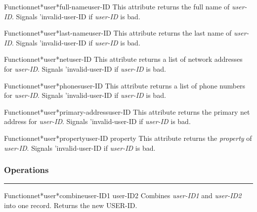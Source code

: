 \begin{functiondoc}{Function}{net*user*full-name}{user-ID}
This attribute returns the full name of {\em user-ID}.
Signals 'invalid-user-ID if {\em user-ID} is bad.
\end{functiondoc}

\begin{functiondoc}{Function}{net*user*last-name}{user-ID}
This attribute returns the last name of {\em user-ID}.
Signals 'invalid-user-ID if {\em user-ID} is bad.
\end{functiondoc}

\begin{functiondoc}{Function}{net*user*net}{user-ID}
This attribute returns a list of network addresses for {\em user-ID}.
Signals 'invalid-user-ID if {\em user-ID} is bad.
\end{functiondoc}

\begin{functiondoc}{Function}{net*user*phones}{user-ID}
This attribute returns a list of phone numbers for {\em user-ID}.
Signals 'invalid-user-ID if {\em user-ID} is bad.
\end{functiondoc}

\begin{functiondoc}{Function}{net*user*primary-address}{user-ID}
This attribute returns the primary net address for {\em user-ID}.
Signals 'invalid-user-ID if {\em user-ID} is bad.
\end{functiondoc}

\begin{functiondoc}{Function}{net*user*property}{user-ID property}
This attribute returns the {\em property} of {\em user-ID}.
Signals 'invalid-user-ID if {\em user-ID} is bad.
\end{functiondoc}


\subsubsection*{Operations}
\par\vspace*{0.00in}\par\hrule\par\medskip\par


\begin{functiondoc}{Function}{net*user*combine}{user-ID1 user-ID2}
Combines {\em user-ID1} and {\em user-ID2} into one record.
Returns the new USER-ID.
\end{functiondoc}

